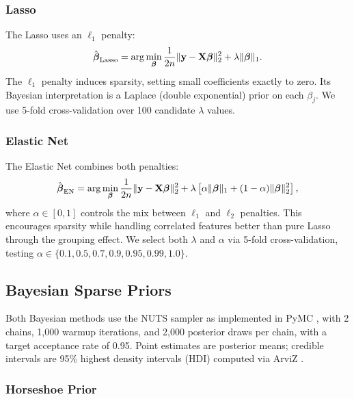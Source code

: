 \subsubsection{Lasso}

The Lasso \citep{tibshirani1996regression} uses an $\ell_1$ penalty:
\begin{equation}
\hat{\boldsymbol{\beta}}_{\text{Lasso}} = \arg\min_{\boldsymbol{\beta}} \frac{1}{2n} \|\mathbf{y} - \mathbf{X} \boldsymbol{\beta}\|_2^2 + \lambda \|\boldsymbol{\beta}\|_1.
\end{equation}
The $\ell_1$ penalty induces sparsity, setting small coefficients exactly to zero.
Its Bayesian interpretation is a Laplace (double exponential) prior on each $\beta_j$.
We use 5-fold cross-validation over 100 candidate $\lambda$ values.

\subsubsection{Elastic Net}

The Elastic Net \citep{zou2005regularization} combines both penalties:
\begin{equation}
\hat{\boldsymbol{\beta}}_{\text{EN}} = \arg\min_{\boldsymbol{\beta}} \frac{1}{2n} \|\mathbf{y} - \mathbf{X} \boldsymbol{\beta}\|_2^2 + \lambda \left[\alpha \|\boldsymbol{\beta}\|_1 + (1-\alpha) \|\boldsymbol{\beta}\|_2^2\right],
\end{equation}
where $\alpha \in [0,1]$ controls the mix between $\ell_1$ and $\ell_2$ penalties.
This encourages sparsity while handling correlated features better than pure Lasso through the grouping effect.
We select both $\lambda$ and $\alpha$ via 5-fold cross-validation, testing $\alpha \in \{0.1, 0.5, 0.7, 0.9, 0.95, 0.99, 1.0\}$.

\subsection{Bayesian Sparse Priors}

Both Bayesian methods use the NUTS sampler \citep{hoffman2014no} as implemented in PyMC \citep{abril2023pymc}, with 2 chains, 1{,}000 warmup iterations, and 2{,}000 posterior draws per chain, with a target acceptance rate of 0.95.
Point estimates are posterior means; credible intervals are 95\% highest density intervals (HDI) computed via ArviZ \citep{kumar2019arviz}.

\subsubsection{Horseshoe Prior}

